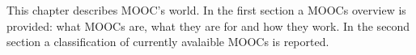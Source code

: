 This chapter describes MOOC’s world. In the first section a MOOCs overview is provided: what MOOCs are, what they are for and how they work. In the second section a classification of currently avalaible MOOCs is reported.